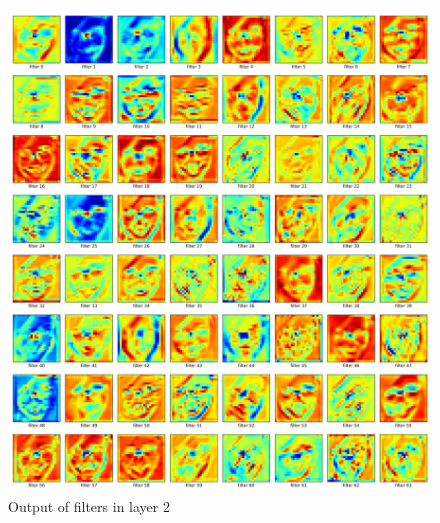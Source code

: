 \documentclass[fleqn,a4paper,12pt]{article}
\begin{document}
\begin{figure}[h]
  \centering
  \includegraphics[width=\linewidth]{report-imgs/filter-output.png}
  \caption{Output of filters in layer 2}
  \label{fig:Output of filters in layer 2}
\end{figure}
\end{document}

